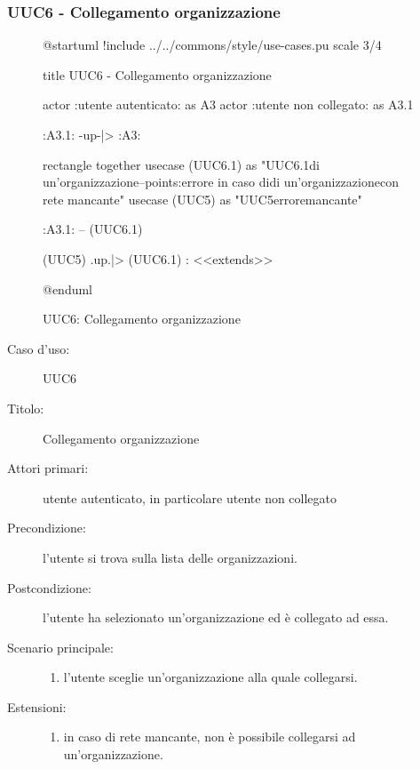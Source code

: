 \documentclass[casi-duso]{subfiles}
\begin{document}
\subsubsection{UUC6 - Collegamento organizzazione}%
\label{subsub:UUC6utente}

\begin{figure}[h!] 
  \centering 
  \begin{plantuml}
  @startuml
  !include ../../commons/style/use-cases.pu
  scale 3/4

  title UUC6 - Collegamento organizzazione

  actor :utente autenticato: as A3
  actor :utente non collegato: as A3.1

  :A3.1: -up-|> :A3:

  rectangle {
    together {
      usecase (UUC6.1) as "UUC6.1\nSelezionamento di un'organizzazione\n--\nExtension points:\nVisualizzazione errore in caso di\nselezionamento di un'organizzazione\n con rete mancante"
      usecase (UUC5) as "UUC5\nVisualizzazione errore\nrete mancante"
    }
  }

  :A3.1: -- (UUC6.1)

  (UUC5) .up.|> (UUC6.1) : <<extends>>

  @enduml
  \end{plantuml} 
  \caption{UUC6: Collegamento organizzazione} 
  \label{fig:uuc6} 
\end{figure}

\begin{description}
  \item[Caso d’uso:] UUC6
  \item[Titolo:] Collegamento organizzazione
  \item[Attori primari:] utente autenticato, in particolare utente non collegato
  \item[Precondizione:] l'utente si trova sulla lista delle organizzazioni.
  \item[Postcondizione:] l'utente ha selezionato un'organizzazione ed è collegato ad essa.
  \item[Scenario principale:]
        \begin{enumerate}
          \item l'utente sceglie un'organizzazione alla quale collegarsi.
        \end{enumerate}
  \item[Estensioni:]
        \begin{enumerate}
          \item in caso di rete mancante, non è possibile collegarsi ad un'organizzazione.
        \end{enumerate}
\end{description}
\end{document}

